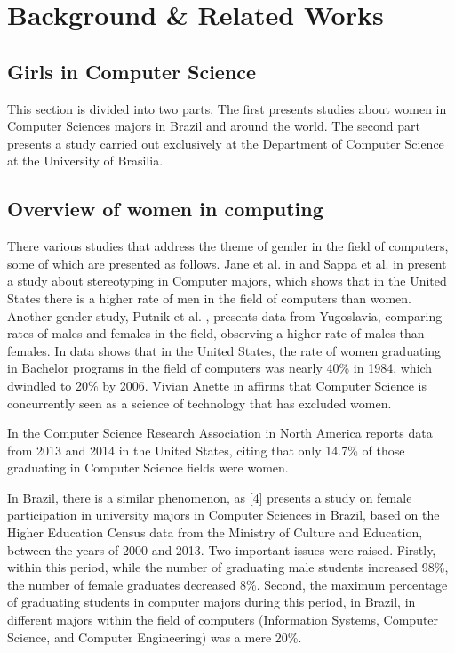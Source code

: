 \section{Background \& Related Works}\label{sec:background}%

\subsection{Girls in Computer Science}\label{subsec:background:girls}%
This section is divided into two parts. The first presents studies about women in Computer Sciences majors in Brazil and around the world. The second part presents a study carried out exclusively at the Department of Computer Science at the University of Brasilia.

\subsection{Overview of women in computing }
There various studies that address the theme of gender in the field of computers, some of which are presented as follows.
Jane et al. in \cite{jane_2016} and Sappa et al. in \cite{sappa_2013} present a study about stereotyping in Computer majors, which shows that in the United States there is a higher rate of men in the field of computers than women. Another gender study, Putnik et al.  \cite{zoran_2017}, presents data from Yugoslavia, comparing rates of males and females in the field, observing a higher rate of males than females. In \cite{keinan_2017} \cite{moshe_2015} data shows that in the United States, the rate of women graduating in Bachelor programs in the field of computers was nearly 40\% in 1984, which dwindled to 20\% by 2006. Vivian Anette in \cite{vivian_2007} affirms that Computer Science is concurrently seen as a science of technology that has excluded women.

 In \cite{moshe_2015}  the Computer Science Research Association in North America reports data from 2013 and 2014 in the United States, citing that only 14.7\% of those graduating in Computer Science fields were women. 

In Brazil, there is a similar phenomenon, as [4] presents a study on female participation in university majors in Computer Sciences in Brazil, based on the Higher Education Census data from the Ministry of Culture and Education, between the years of 2000 and 2013. Two important issues were raised. Firstly, within this period, while the number of graduating male students increased 98\%, the number of female graduates decreased 8\%. Second, the maximum percentage of graduating students in computer majors during this period, in Brazil, in different majors within the field of computers (Information Systems, Computer Science, and Computer Engineering) was a mere 20\%.  


